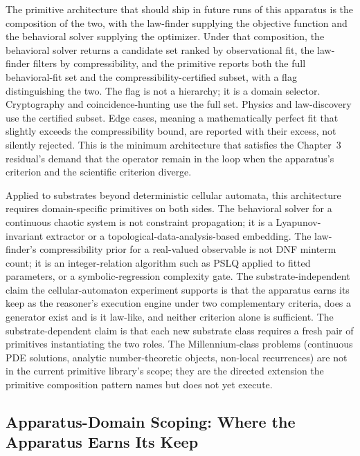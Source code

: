 \documentclass[11pt]{article}
\begin{document}
The primitive architecture that should ship in future runs of this apparatus is the composition of the two, with the law-finder supplying the objective function and the behavioral solver supplying the optimizer. Under that composition, the behavioral solver returns a candidate set ranked by observational fit, the law-finder filters by compressibility, and the primitive reports both the full behavioral-fit set and the compressibility-certified subset, with a flag distinguishing the two. The flag is not a hierarchy; it is a domain selector. Cryptography and coincidence-hunting use the full set. Physics and law-discovery use the certified subset. Edge cases, meaning a mathematically perfect fit that slightly exceeds the compressibility bound, are reported with their excess, not silently rejected. This is the minimum architecture that satisfies the Chapter~3 residual's demand that the operator remain in the loop when the apparatus's criterion and the scientific criterion diverge.

Applied to substrates beyond deterministic cellular automata, this architecture requires domain-specific primitives on both sides. The behavioral solver for a continuous chaotic system is not constraint propagation; it is a Lyapunov-invariant extractor or a topological-data-analysis-based embedding. The law-finder's compressibility prior for a real-valued observable is not DNF minterm count; it is an integer-relation algorithm such as PSLQ applied to fitted parameters, or a symbolic-regression complexity gate. The substrate-independent claim the cellular-automaton experiment supports is that the apparatus earns its keep as the reasoner's execution engine under two complementary criteria, does a generator exist and is it law-like, and neither criterion alone is sufficient. The substrate-dependent claim is that each new substrate class requires a fresh pair of primitives instantiating the two roles. The Millennium-class problems (continuous PDE solutions, analytic number-theoretic objects, non-local recurrences) are not in the current primitive library's scope; they are the directed extension the primitive composition pattern names but does not yet execute.

\subsection*{Apparatus-Domain Scoping: Where the Apparatus Earns Its Keep}
\end{document}
